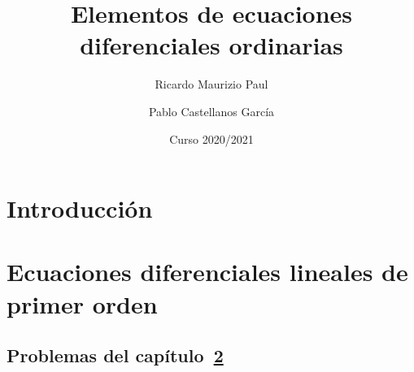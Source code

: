 \documentclass{report}
\title{Elementos de ecuaciones diferenciales ordinarias}
\author{Ricardo Maurizio Paul \and Pablo Castellanos García}
\date{Curso 2020/2021}
\begin{document}
\maketitle
\tableofcontents

\setcounter{chapter}{-1}
\chapter{Introducción}


\chapter{Ecuaciones diferenciales lineales de primer orden}
\label{chap:capitulo1}


\section{Problemas del capítulo~\ref{chap:capitulo1}}

\end{document}
